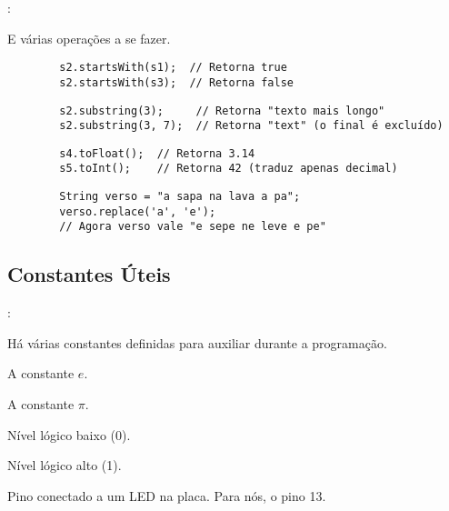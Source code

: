 \begin{frame}[fragile]{\insertsection: \insertsubsection}

	E várias operações a se fazer.

	\begin{verbatim}
		s2.startsWith(s1);  // Retorna true
		s2.startsWith(s3);  // Retorna false
	\end{verbatim}

	\begin{verbatim}
		s2.substring(3);     // Retorna "texto mais longo"
		s2.substring(3, 7);  // Retorna "text" (o final é excluído)
	\end{verbatim}

	\begin{verbatim}
		s4.toFloat();  // Retorna 3.14
		s5.toInt();    // Retorna 42 (traduz apenas decimal)
	\end{verbatim}

	\begin{verbatim}
		String verso = "a sapa na lava a pa";
		verso.replace('a', 'e');
		// Agora verso vale "e sepe ne leve e pe"
	\end{verbatim}

\end{frame}


\subsection{Constantes Úteis}


\begin{frame}{\insertsection: \insertsubsection}

	Há várias constantes definidas para auxiliar durante a programação.
	\begin{description} %
		\item[\texttt{EULER}] A constante $e$.
		\item[\texttt{PI}] A constante $\pi$.
		\item[\texttt{LOW}] Nível lógico baixo (0).
		\item[\texttt{HIGH}] Nível lógico alto (1).
		\item[\texttt{LED\_BUILTIN}] Pino conectado a um LED na placa. Para nós, o pino 13.
		\item[\texttt{...}]
	\end{description}

\end{frame}


